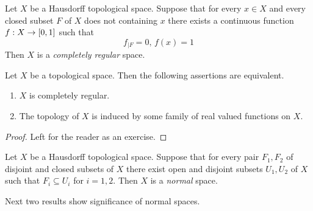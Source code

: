 \begin{definition}
	Let $X$ be a Hausdorff topological space. Suppose that for every $x \in X$ and every closed subset $F$ of $X$ does not containing $x$ there exists a continuous function $f:X\rightarrow [0,1]$ such that
	$$f_{\mid F} = 0,\,f(x) = 1$$
	Then $X$ is a \textit{completely regular} space.
\end{definition}

\begin{fact}\label{fact:characterization_of_completely_regular_spaces}
	Let $X$ be a topological space. Then the following assertions are equivalent.
	\begin{enumerate}[label=\emph{\textbf{(\roman*)}}, leftmargin=3.0em]
		\item $X$ is completely regular.
		\item The topology of $X$ is induced by some family of real valued functions on $X$.
	\end{enumerate}
\end{fact}
\begin{proof}
	Left for the reader as an exercise.
\end{proof}

\begin{definition}
	Let $X$ be a Hausdorff topological space. Suppose that for every pair $F_1,F_2$ of disjoint and closed subsets of $X$ there exist open and disjoint subsets $U_1,U_2$ of $X$ such that $F_i \subseteq U_i$ for $i=1,2$. Then $X$ is a \textit{normal} space.
\end{definition}
\noindent
Next two results show significance of normal spaces.

